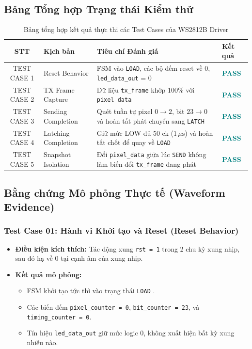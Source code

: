 \documentclass[12pt,a4paper]{article}
\begin{document}
\subsection{Bảng Tổng hợp Trạng thái Kiểm thử}
\begin{table}[H]
    \centering
    \caption{Bảng tổng hợp kết quả thực thi các Test Cases của WS2812B Driver}
    \label{tab:driver_test_cases}
    \begin{tabularx}{\textwidth}{c p{3.2cm} p{7.5cm} >{\centering\arraybackslash}X}
        \toprule
        \textbf{STT} & \textbf{Kịch bản} & \textbf{Tiêu chí Đánh giá} & \textbf{Kết quả} \\
        \midrule
        TEST CASE 1 & Reset Behavior & FSM vào \texttt{LOAD}, các bộ đếm reset về 0, \texttt{led\_data\_out} = 0 & \textcolor{teal}{\textbf{PASS}} \\
        TEST CASE 2 & TX Frame Capture & Dữ liệu \texttt{tx\_frame} khớp 100\% với \texttt{pixel\_data} & \textcolor{teal}{\textbf{PASS}} \\
        TEST CASE 3 & Sending Completion & Quét tuần tự pixel $0 \to 2$, bit $23 \to 0$ và hoàn tất phát chuyển sang \texttt{LATCH} & \textcolor{teal}{\textbf{PASS}} \\
        TEST CASE 4 & Latching Completion & Giữ mức LOW đủ 50 ck ($1\,\mu\text{s}$) và hoàn tất chốt để quay về \texttt{LOAD} & \textcolor{teal}{\textbf{PASS}} \\
        TEST CASE 5 & Snapshot Isolation & Đổi \texttt{pixel\_data} giữa lúc \texttt{SEND} không làm biến đổi \texttt{tx\_frame} đang phát & \textcolor{teal}{\textbf{PASS}} \\
        \bottomrule
    \end{tabularx}
\end{table}

\subsection{Bằng chứng Mô phỏng Thực tế (Waveform Evidence)}

\subsubsection{Test Case 01: Hành vi Khởi tạo và Reset (Reset Behavior)}
\begin{itemize}
    \item \textbf{Điều kiện kích thích:} Tác động xung \texttt{rst = 1} trong 2 chu kỳ xung nhịp, sau đó hạ về 0 tại cạnh âm của xung nhịp.
    \item \textbf{Kết quả mô phỏng:} 
    \begin{itemize}
        \item FSM khởi tạo tức thì vào trạng thái \texttt{LOAD} .
        \item Các biến đếm \texttt{pixel\_counter = 0}, \texttt{bit\_counter = 23}, và \texttt{timing\_counter = 0}.
        \item Tín hiệu \texttt{led\_data\_out} giữ mức logic 0, không xuất hiện bất kỳ xung nhiễu nào.
    \end{itemize}
\end{itemize}
\end{document}
